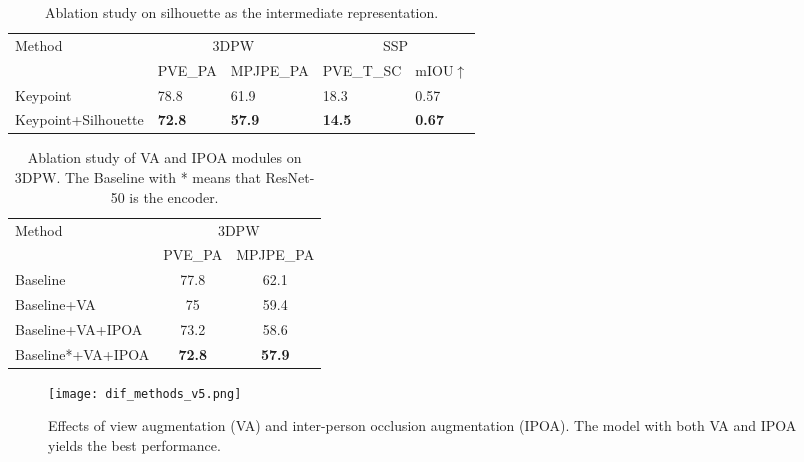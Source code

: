 \documentclass[journal]{IEEEtran}
\begin{document}
{
\begin{table}[!htbp]
\caption{Ablation study on silhouette as the intermediate representation.}
\begin{tabular}{lllll}
\hline
\multirow{2}{*}{Method} & \multicolumn{2}{c}{3DPW}                                    & \multicolumn{2}{c}{SSP}                                   \\
                        & \multicolumn{1}{c}{PVE\_PA } & \multicolumn{1}{c}{MPJPE\_PA } & \multicolumn{1}{c}{PVE\_T\_SC} & \multicolumn{1}{c}{mIOU$\uparrow$} \\ \cline{2-5} 
Keypoint                & 78.8                        & 61.9                          & 18.3                           & 0.57                     \\
Keypoint+Silhouette     & \textbf{72.8}               & \textbf{57.9}                 & \textbf{14.5}                  & \textbf{0.67}            \\ \hline
\end{tabular}
\label{tab:ks}
\end{table}
\vspace{-0.2cm}
}


\begin{table}[!htbp]
\caption{Ablation study of VA and IPOA modules on 3DPW. The Baseline with * means that ResNet-50 is the encoder.}
\begin{center}

\begin{tabular}{@{}lcc@{}}
\toprule
\multirow{2}{*}{Method}         & \multicolumn{2}{c}{3DPW} \\
                                & PVE\_PA    & MPJPE\_PA   \\ \midrule
Baseline                        & 77.8       & 62.1        \\
Baseline+VA               & 75         & 59.4        \\
Baseline+VA+IPOA & 73.2       & 58.6       \\ 
Baseline*+VA+IPOA & \textbf{72.8}       & \textbf{57.9}        \\ \bottomrule
\end{tabular}
\label{3dpw}
\end{center}
\end{table}
\vspace{-0.2cm}

\begin{figure}
    
    \centerline{\texttt{[image: dif\_methods\_v5.png]}}
\caption{Effects of view augmentation (VA) and inter-person occlusion augmentation (IPOA). The model with both VA and IPOA yields the best performance.}
    \label{fig:dif_methods}
\end{figure}
\end{document}

